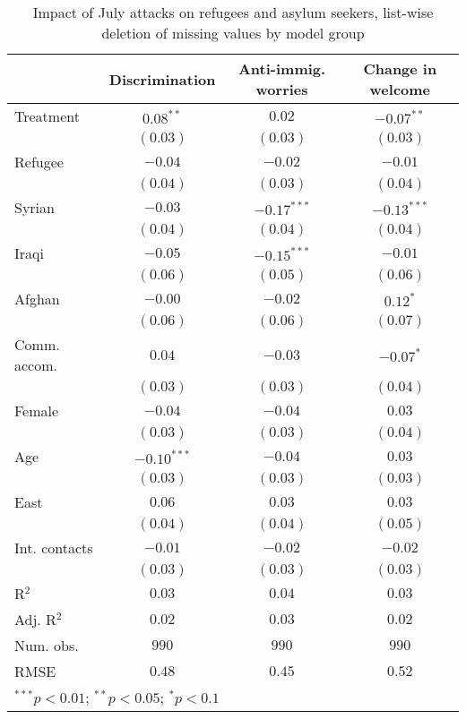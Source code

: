 
\begin{table}
\caption{Impact of July attacks on refugees and asylum seekers, list-wise deletion of missing values by model group}
\begin{center}
\begin{tabular}{l c c c}
\toprule
 & Discrimination & Anti-immig. worries & Change in welcome \\
\midrule
Treatment     & $0.08^{**}$   & $0.02$        & $-0.07^{**}$  \\
              & $(0.03)$      & $(0.03)$      & $(0.03)$      \\
Refugee       & $-0.04$       & $-0.02$       & $-0.01$       \\
              & $(0.04)$      & $(0.03)$      & $(0.04)$      \\
Syrian        & $-0.03$       & $-0.17^{***}$ & $-0.13^{***}$ \\
              & $(0.04)$      & $(0.04)$      & $(0.04)$      \\
Iraqi         & $-0.05$       & $-0.15^{***}$ & $-0.01$       \\
              & $(0.06)$      & $(0.05)$      & $(0.06)$      \\
Afghan        & $-0.00$       & $-0.02$       & $0.12^{*}$    \\
              & $(0.06)$      & $(0.06)$      & $(0.07)$      \\
Comm. accom.  & $0.04$        & $-0.03$       & $-0.07^{*}$   \\
              & $(0.03)$      & $(0.03)$      & $(0.04)$      \\
Female        & $-0.04$       & $-0.04$       & $0.03$        \\
              & $(0.03)$      & $(0.03)$      & $(0.04)$      \\
Age           & $-0.10^{***}$ & $-0.04$       & $0.03$        \\
              & $(0.03)$      & $(0.03)$      & $(0.03)$      \\
East          & $0.06$        & $0.03$        & $0.03$        \\
              & $(0.04)$      & $(0.04)$      & $(0.05)$      \\
Int. contacts & $-0.01$       & $-0.02$       & $-0.02$       \\
              & $(0.03)$      & $(0.03)$      & $(0.03)$      \\
\midrule
R$^2$         & $0.03$        & $0.04$        & $0.03$        \\
Adj. R$^2$    & $0.02$        & $0.03$        & $0.02$        \\
Num. obs.     & $990$         & $990$         & $990$         \\
RMSE          & $0.48$        & $0.45$        & $0.52$        \\
\bottomrule
\multicolumn{4}{l}{\scriptsize{$^{***}p<0.01$; $^{**}p<0.05$; $^{*}p<0.1$}}
\end{tabular}
\label{tab_host_na_group}
\end{center}
\end{table}

